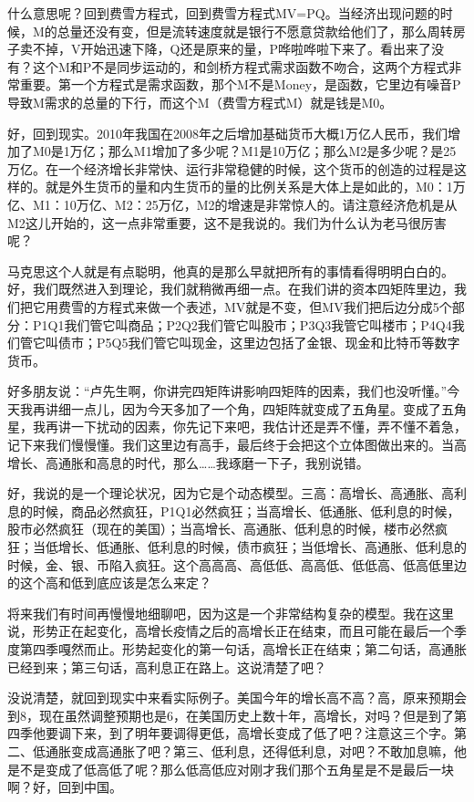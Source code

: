 \documentclass[UTF8, 12pt, a4paper]{ctexrep}
\begin{document}
什么意思呢？回到费雪方程式，回到费雪方程式MV=PQ。当经济出现问题的时候，M的总量还没有变，但是流转速度就是银行不愿意贷款给他们了，那么周转房子卖不掉，V开始迅速下降，Q还是原来的量，P哗啦哗啦下来了。看出来了没有？这个M和P不是同步运动的，和剑桥方程式需求函数不吻合，这两个方程式非常重要。第一个方程式是需求函数，那个M不是Money，是函数，它里边有噪音P导致M需求的总量的下行，而这个M（费雪方程式M）就是钱是M0。

好，回到现实。2010年我国在2008年之后增加基础货币大概1万亿人民币，我们增加了M0是1万亿；那么M1增加了多少呢？M1是10万亿；那么M2是多少呢？是25万亿。在一个经济增长非常快、运行非常稳健的时候，这个货币的创造的过程是这样的。就是外生货币的量和内生货币的量的比例关系是大体上是如此的，M0：1万亿、M1：10万亿、M2：25万亿，M2的增速是非常惊人的。请注意经济危机是从M2这儿开始的，这一点非常重要，这不是我说的。我们为什么认为老马很厉害呢？

马克思这个人就是有点聪明，他真的是那么早就把所有的事情看得明明白白的。好，我们既然进入到理论，我们就稍微再细一点。在我们讲的资本四矩阵里边，我们把它用费雪的方程式来做一个表述，MV就是不变，但MV我们把后边分成5个部分：P1Q1我们管它叫商品；P2Q2我们管它叫股市；P3Q3我管它叫楼市；P4Q4我们管它叫债市；P5Q5我们管它叫现金，这里边包括了金银、现金和比特币等数字货币。

好多朋友说：“卢先生啊，你讲完四矩阵讲影响四矩阵的因素，我们也没听懂。”今天我再讲细一点儿，因为今天多加了一个角，四矩阵就变成了五角星。变成了五角星，我再讲一下扰动的因素，你先记下来吧，我估计还是弄不懂，弄不懂不着急，记下来我们慢慢懂。我们这里边有高手，最后终于会把这个立体图做出来的。当高增长、高通胀和高息的时代，那么……我琢磨一下子，我别说错。

好，我说的是一个理论状况，因为它是个动态模型。三高：高增长、高通胀、高利息的时候，商品必然疯狂，P1Q1必然疯狂；当高增长、低通胀、低利息的时候，股市必然疯狂（现在的美国）；当高增长、高通胀、低利息的时候，楼市必然疯狂；当低增长、低通胀、低利息的时候，债市疯狂；当低增长、高通胀、低利息的时候，金、银、币陷入疯狂。这个高高高、高低低、高高低、低低高、低高低里边的这个高和低到底应该是怎么来定？

将来我们有时间再慢慢地细聊吧，因为这是一个非常结构复杂的模型。我在这里说，形势正在起变化，高增长疫情之后的高增长正在结束，而且可能在最后一个季度第四季嘎然而止。形势起变化的第一句话，高增长正在结束；第二句话，高通胀已经到来；第三句话，高利息正在路上。这说清楚了吧？

没说清楚，就回到现实中来看实际例子。美国今年的增长高不高？高，原来预期会到8，现在虽然调整预期也是6，在美国历史上数十年，高增长，对吗？但是到了第四季他要调下来，到了明年要调得更低，高增长变成了低了吧？注意这三个字。第二、低通胀变成高通胀了吧？第三、低利息，还得低利息，对吧？不敢加息嘛，他是不是变成了低高低了呢？那么低高低应对刚才我们那个五角星是不是最后一块啊？好，回到中国。
\end{document}
